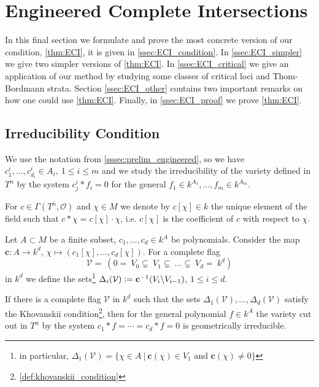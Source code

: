 \section{Engineered Complete Intersections}\label{sec:ECI}
In this final section we formulate and prove the most concrete version of our condition, \autoref{thm:ECI}, it is given in \autoref{ssec:ECI_condition}. In \autoref{ssec:ECI_simpler} we give two simpler versions of \autoref{thm:ECI}. In \autoref{ssec:ECI_critical} we give an application of our method by studying some classes of critical loci and Thom-Bordmann strata. Section \ref{ssec:ECI_other} contains two important remarks on how one could use \autoref{thm:ECI}. Finally, in \autoref{ssec:ECI_proof} we prove \autoref{thm:ECI}.

\subsection{Irreducibility Condition}\label{ssec:ECI_condition}
We use the notation from \autoref{sssec:prelim_engineered}, so we have $c^i_1, \dots, c^i_{d_i} \in A_i,\ 1 \le i \le m$ and we study the irreducibility of the variety defined in $T^n$ by the system $c^i_j * f_i = 0$ for the general $f_1 \in k^{A_1}, \dots, f_m \in k^{A_m}$.

\begin{notation}
    For $c \in \Gamma(T^n, \mathcal O)$ and $\chi \in M$ we denote by $c[\chi] \in k$ the unique element of the field such that $c * \chi = c[\chi] \cdot \chi$, i.e. $c[\chi]$ is the coefficient of $c$ with respect to $\chi$.
\end{notation}

\begin{theorem}\label{thm:ECI}
    Let $A \subset M$ be a finite subset, $c_1, \dots, c_d \in k^A$ be polynomials. Consider the map $\mathbf c: A \to k^d$, $\chi \mapsto (c_1[\chi], \dots, c_d [\chi])$. For a complete flag
    \[
    \mathcal V = ~(0 = ~V_0 \subsetneq ~V_1 \subsetneq ~\dots \subsetneq ~V_d = ~k^d)
    \]
    in $k^d$ we define the sets\footnote{in particular, $\Delta_1 (\mathcal V) = \{ \chi \in A\ |\ \mathbf c(\chi) \in V_1\text{ and } \mathbf c(\chi) \ne 0\}$ } $\Delta_i (\mathcal V) \vcentcolon= \mathbf c^{-1}(V_i \backslash V_{i - 1})$, $1 \le i \le d$. 

    If there is a complete flag $\mathcal V$ in $k^d$ such that the sets $\Delta_1(\mathcal V), \dots, \Delta_d(\mathcal V)$ satisfy the Khovanskii condition\footnote{\autoref{def:khovanskii_condition}}, then for the general polynomial $f \in k^A$ the variety cut out in $T^n$ by the system $c_1 * f = \cdots = c_d * f = 0$ is geometrically irreducible.
\end{theorem}

